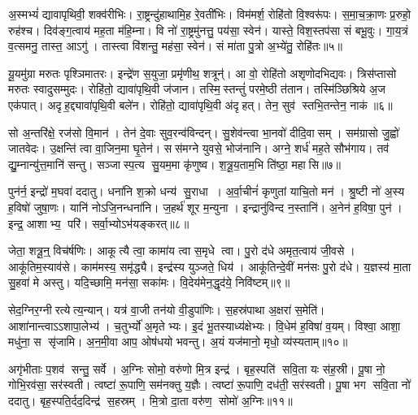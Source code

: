 अ॒स्मभ्यं॑ द्यावापृथिवी॒ शक्व॑रीभिः।
रा॒ष्ट्रन्दु॑हाथामि॒ह रे॒वती॑भिः।
विम॑मर्\mbox{}श॒ रोहि॑तो वि॒श्वरू॑पः।
स॒मा॒च॒क्रा॒णः प्र॒रुहो॒ रुह॑श्च।
दिव॑ङ्ग॒त्वाय॑ मह॒ता म॑हि॒म्ना।
वि नो॑ रा॒ष्ट्रमु॑नत्तु॒ पय॑सा॒ स्वेन॑।
यास्ते॒ विश॒स्तप॑सा सं बभू॒वुः।
गा॒य॒त्रं व॒त्समनु॒ तास्त॒ आऽगु॑।
तास्त्वा वि॑शन्तु॒ मह॑सा॒ स्वेन॑।
सं मा॑ता पु॒त्रो अ॒भ्ये॑तु॒ रोहि॑तः॥५॥

यू॒यमु॑ग्रा मरुतः पृश्ञिमातरः।
इन्द्रे॑ण स॒युजा॒ प्रमृ॑णीथ॒ शत्रून्॑।
आ वो॒ रोहि॑तो अशृणोदभिद्यवः।
त्रिस॑प्तासो मरुतः स्वादुसम्मुदः।
रोहि॑तो॒ द्यावा॑पृथि॒वी ज॑जान।
तस्मि॒स्तन्तुं॑ परमे॒ष्ठी त॑तान।
तस्मि॑ञ्छिश्रिये अ॒ज एक॑पात्।
अदृह॒द्द्यावा॑पृथि॒वी बले॑न।
रोहि॑तो॒ द्यावा॑पृथि॒वी अ॑दृहत्।
तेन॒ सुव॑ स्तभि॒तन्तेन॒ नाक॑॥६॥

सो अ॒न्तरि॑क्षे॒ रज॑सो वि॒मान॑।
तेन॑ दे॒वाः सुव॒रन्व॑विन्दन्।
सु॒शेव॑न्त्वा भा॒नवो॑ दीदि॒वासम्।
सम॑ग्रासो जु॒ह्वो॑ जातवेदः।
उ॒क्षन्ति॑ त्वा वा॒जिन॒मा घृ॒तेन॑।
सस॑मग्ने युवसे॒ भोज॑नानि।
अग्ने॒ शर्ध॑ मह॒ते सौभ॑गाय।
तव॑ द्यु॒म्नान्यु॑त्त॒मानि॑ सन्तु।
सञ्जास्प॒त्य सु॒यम॒मा कृ॑णुष्व।
श॒त्रू॒य॒ताम॒भि ति॑ष्ठा॒ महासि॥७॥\anuvakamend[अ॒स्त्वे॒तु॒ रोहि॑तो॒ नाको॒ महासि]

पुन॑र्न॒ इन्द्रो॑ म॒घवा॑ ददातु।
धना॑नि श॒क्रो धन्य॑ सु॒राधा।
अ॒र्वा॒चीनं॑ कृणुतां याचि॒तो मन॑।
श्रु॒ष्टी नो॑ अ॒स्य ह॒विषो॑ जुषा॒णः।
यानि॑ नोऽजि॒नन्धना॑नि।
ज॒हर्थ॑ शूर म॒न्युना।
इन्द्रानु॑विन्द न॒स्तानि॑।
अ॒नेन॑ ह॒विषा॒ पुन॑।
इन्द्र॒ आशाभ्य॒ परि॑।
सर्वा॒भ्योऽभ॑यङ्करत्॥८॥

जेता॒ शत्रू॒न्॒ विच॑र्\mbox{}षणिः।
आकूत्यै त्वा॒ कामा॑य त्वा स॒मृधे त्वा।
पु॒रो द॑धे अमृत॒त्वाय॑ जी॒वसे।
आकू॑तिम॒स्याव॑से।
काम॑मस्य॒ समृ॑द्ध्यै।
इन्द्र॑स्य युञ्जते॒ धिय॑।
आकू॑तिन्दे॒वीं मन॑सः पु॒रो द॑धे।
य॒ज्ञस्य॑ मा॒ता सु॒हवा॑ मे अस्तु।
यदि॒च्छामि॒ मन॑सा॒ सका॑मः।
वि॒देय॑मेन॒द्धृद॑ये॒ निवि॑ष्टम्॥९॥

सेद॒ग्निर॒ग्नीरत्येत्य॒न्यान्।
यत्र॑ वा॒जी तन॑यो वी॒डुपा॑णिः।
स॒हस्र॑पाथा अ॒क्षरा॑ स॒मेति॑।
आशा॑नान्त्वाऽऽशापा॒लेभ्य॑।
च॒तुर्भ्यो॑ अ॒मृतेभ्यः।
इ॒दं भू॒तस्याध्य॑क्षेभ्यः।
वि॒धेम॑ ह॒विषा॑ व॒यम्।
विश्वा॒ आशा॒ मधु॑ना॒ स सृ॑जामि।
अ॒न॒मी॒वा आप॒ ओष॑धयो भवन्तु।
अ॒यं यज॑मानो॒ मृधो॒ व्य॑स्यताम्॥१०॥

अगृ॑भीताः प॒शव॑ सन्तु॒ सर्वे।
अ॒ग्निः सोमो॒ वरु॑णो मि॒त्र इन्द्र॑।
बृह॒स्पति॑ सवि॒ता यः स॑ह॒स्री।
पू॒षा नो॒ गोभि॒रव॑सा॒ सर॑स्वती।
त्वष्टा॑ रू॒पाणि॒ सम॑नक्तु य॒ज्ञैः।
त्वष्टा॑ रू॒पाणि॒ दध॑ती॒ सर॑स्वती।
पू॒षा भग सवि॒ता नो॑ ददातु।
बृह॒स्पति॒र्दद॒दिन्द्र॑ स॒हस्रम्।
मि॒त्रो दा॒ता वरु॑ण॒ सोमो॑ अ॒ग्निः॥११॥\anuvakamend[क॒र॒न्निवि॑ष्टमस्यता॒न्नव॑ च]

